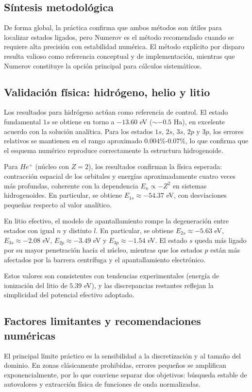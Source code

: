 \documentclass[11pt]{article}
\begin{document}
\subsection{Síntesis metodológica}\label{comparativa-metodos}
De forma global, la práctica confirma que ambos métodos son útiles para localizar estados ligados, pero Numerov es el método recomendado cuando se requiere alta precisión con estabilidad numérica. El método explícito por disparo resulta valioso como referencia conceptual y de implementación, mientras que Numerov constituye la opción principal para cálculos sistemáticos.

\subsection{Validación física: hidrógeno, helio y litio}\label{validacion-fisica}
Los resultados para hidrógeno actúan como referencia de control. El estado fundamental $1s$ se obtiene en torno a $-13.60$ eV ($\sim -0.5$ Ha), en excelente acuerdo con la solución analítica. Para los estados $1s$, $2s$, $3s$, $2p$ y $3p$, los errores relativos se mantienen en el rango aproximado $0.004\%$-$0.07\%$, lo que confirma que el esquema numérico reproduce correctamente la estructura hidrogenoide.

Para $He^+$ (núcleo con $Z=2$), los resultados confirman la física esperada: contracción espacial de los orbitales y energías aproximadamente cuatro veces más profundas, coherente con la dependencia $E_n \propto -Z^2$ en sistemas hidrogenoides. En particular, se obtiene $E_{1s}\approx -54.37$ eV, con desviaciones pequeñas respecto al valor analítico.

En litio efectivo, el modelo de apantallamiento rompe la degeneración entre estados con igual $n$ y distinto $l$. En particular, se obtiene $E_{2s} \approx -5.63$ eV, $E_{3s} \approx -2.08$ eV, $E_{2p} \approx -3.49$ eV y $E_{3p} \approx -1.54$ eV. El estado $s$ queda más ligado por su mayor penetración hacia el núcleo, mientras que los estados $p$ están más afectados por la barrera centrífuga y el apantallamiento electrónico.

Estos valores son consistentes con tendencias experimentales (energía de ionización del litio de $5.39$ eV), y las discrepancias restantes reflejan la simplicidad del potencial efectivo adoptado.

\subsection{Factores limitantes y recomendaciones numéricas}\label{limitaciones-recomendaciones}
El principal límite práctico es la sensibilidad a la discretización y al tamaño del dominio. En zonas clásicamente prohibidas, errores pequeños se amplifican exponencialmente, por lo que conviene separar dos objetivos: búsqueda estable de autovalores y extracción física de funciones de onda normalizadas.
\end{document}
